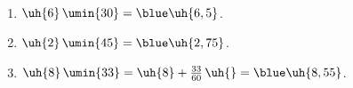    \ \\ [-5mm]
   \begin{enumerate}
      \item $\uh{6}\,\umin{30} =\blue \uh{6,5}$.
      \item $\uh{2}\,\umin{45} =\blue \uh{2,75}$. \smallskip
      \item $\uh{8}\,\umin{33} =\uh{8}+\frac{33}{60}\,\uh{} =\blue \uh{8,55}$.
   \end{enumerate}
